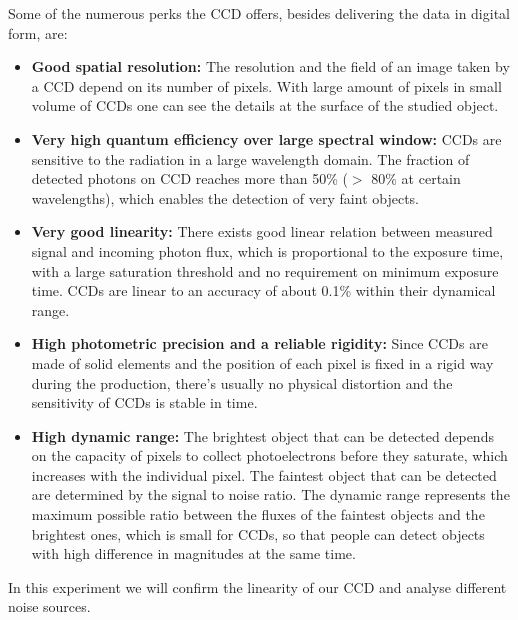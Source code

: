Some of the numerous perks the CCD offers, besides delivering the data in digital form, are:
\begin{itemize}
\item {\textbf{Good spatial resolution:}}
The resolution and the field of an image taken by a CCD depend on its number of pixels. With large amount of pixels in small volume of CCDs one can see the details at the surface of the studied object.
 

\item\textbf{Very high quantum efficiency over large spectral window:}
CCDs are sensitive to the radiation in a large wavelength domain. The fraction of detected photons on CCD reaches more than 50\% ($>$ 80\% at certain wavelengths), which enables the detection of very faint objects. 

\item\textbf{Very good linearity:}
There exists good linear relation between measured signal and incoming photon flux, which is proportional to the exposure time, with a large saturation threshold and no requirement on minimum exposure time. CCDs are linear to an accuracy of about 0.1\% within their dynamical range.
  
\item{\textbf{High photometric precision and a reliable rigidity:}}
Since CCDs are made of solid elements and the position of each pixel is fixed in a rigid way during the production, there's usually no physical distortion and the sensitivity of CCDs is stable in time.  

\item\textbf{High dynamic range:}
The brightest object that can be detected depends on the capacity of pixels to collect photoelectrons before they saturate, which increases with the individual pixel. The faintest object that can be detected are determined by the signal to noise ratio. The dynamic range represents the maximum possible ratio between the fluxes of the faintest objects and the brightest ones, which is small for CCDs, so that people can detect objects with high difference in magnitudes at the same time.
\end{itemize}
In this experiment we will confirm the linearity of our CCD and analyse different noise sources.
\hspace{4mm}
